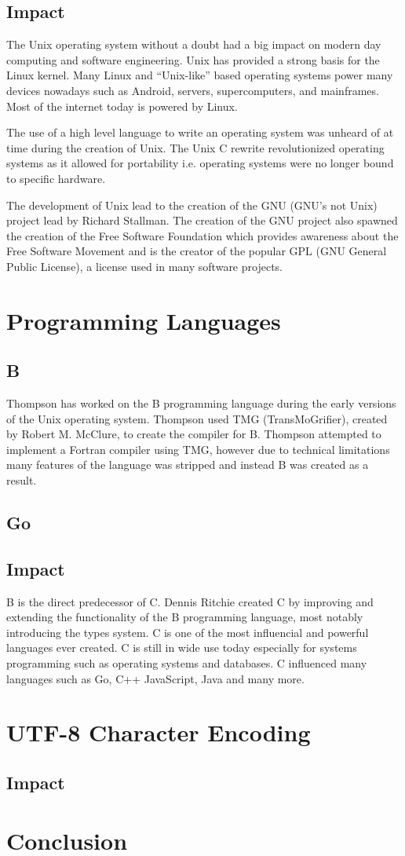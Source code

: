 \documentclass{article}
\begin{document}
\subsection{Impact}
The Unix operating system without a doubt had a big impact on modern day
computing and software engineering. Unix has provided a strong basis for the
Linux kernel. Many Linux and ``Unix-like'' based operating systems power many
devices nowadays such as Android, servers, supercomputers, and mainframes. Most
of the internet today is powered by Linux.

The use of a high level language to write an operating system was unheard of at
time during the creation of Unix. The Unix C rewrite revolutionized operating
systems as it allowed for portability i.e. operating systems were no longer
bound to specific hardware.

The development of Unix lead to the creation of the GNU (GNU's not Unix)
project lead by Richard Stallman. The creation of the GNU project also spawned
the creation of the Free Software Foundation which provides awareness about the
Free Software Movement and is the creator of the popular GPL (GNU General
Public License), a license used in many software projects.

\section{Programming Languages}
\subsection{B}
Thompson has worked on the B programming language during the early versions of
the Unix operating system. Thompson used TMG (TransMoGrifier), created by
Robert M. McClure, to create the compiler for B.  Thompson attempted to
implement a Fortran compiler using TMG, however due to technical limitations
many features of the language was stripped and instead B was created as a
result. \cite{VCF}

\subsection{Go}
\subsection{Impact}
B is the direct predecessor of C. Dennis Ritchie created C by improving and
extending the functionality of the B programming language, most notably
introducing the types system. C is one of the most influencial and powerful
languages ever created. C is still in wide use today especially for systems
programming such as operating systems and databases. C influenced many
languages such as Go, C++ JavaScript, Java and many more.

\section{UTF-8 Character Encoding}
\subsection{Impact}

\section{Conclusion}



\end{document}
